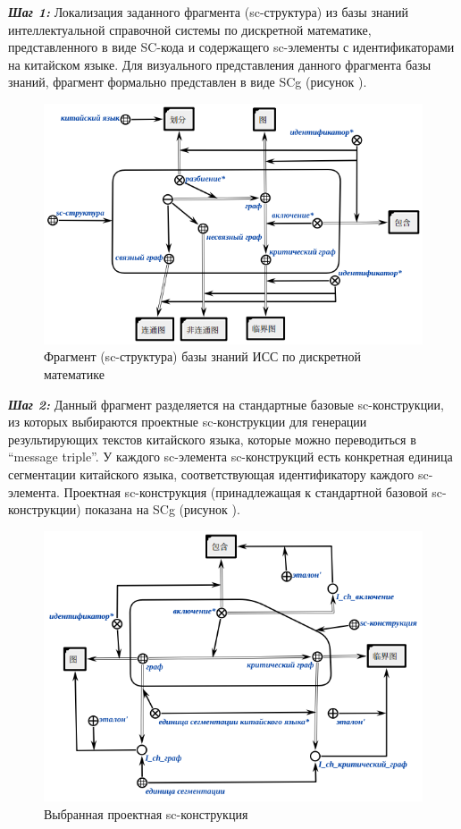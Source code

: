 \textbf{\textit{Шаг 1:}} Локализация заданного фрагмента (sc-структура) из базы знаний интеллектуальной справочной системы по дискретной математике, представленного в виде SC-кода и содержащего sc-элементы с идентификаторами на китайском языке. Для визуального представления данного фрагмента базы знаний, фрагмент формально представлен в виде SCg (рисунок \textit{}).
\begin{figure}[H]
	\centering
	\includegraphics[scale=0.7]{images/part4/chapter_chinese/fragment_knowledge_base.png}
	\caption{Фрагмент (sc-структура) базы знаний ИСС по дискретной математике}
	\label{fig:knowledge-base-fragment}
\end{figure}

\textbf{\textit{Шаг 2:}} Данный фрагмент разделяется на стандартные базовые sc-конструкции, из которых выбираются проектные sc-конструкции для генерации результирующих текстов китайского языка, которые можно переводиться в ``message triple''. У каждого sc-элемента sc-конструкций есть конкретная единица сегментации китайского языка, соответствующая идентификатору каждого sc-элемента. Проектная sc-конструкция (принадлежащая к стандартной базовой sc-конструкции) показана на SCg (рисунок \textit{}).
\begin{figure}[H]
	\centering
	\includegraphics[scale=0.8]{images/part4/chapter_chinese/candidate_sc_structure.png}
	\caption{Выбранная проектная sc-конструкция}
	\label{fig:candidate-sc-construction}
\end{figure}

